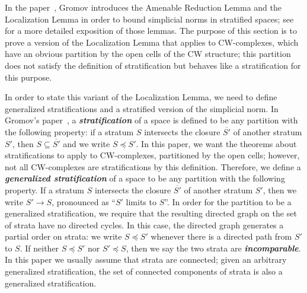 \documentclass[psamsfonts]{amsart}
\theoremstyle{remark}
\begin{document}
In the paper~\cite{Gromov09}, Gromov introduces the Amenable Reduction Lemma and the Localization Lemma in order to bound simplicial norms in stratified spaces; see~\cite{Alpert15} for a more detailed exposition of those lemmas.  The purpose of this section is to prove a version of the Localization Lemma that applies to CW-complexes, which have an obvious partition by the open cells of the CW structure; this partition does not satisfy the definition of stratification but behaves like a stratification for this purpose.

In order to state this variant of the Localization Lemma, we need to define generalized stratifications and a stratified version of the simplicial norm.  In Gromov's paper~\cite{Gromov09}, a \textbf{\emph{stratification}} of a space is defined to be any partition with the following property: if a stratum $S$ intersects the closure $\overline{S'}$ of another stratum $S'$, then $S \subseteq \overline{S'}$ and we write $S \preceq S'$.  In this paper, we want the theorems about stratifications to apply to CW-complexes, partitioned by the open cells; however, not all CW-complexes are stratifications by this definition.  Therefore, we define a \textbf{\emph{generalized stratification}} of a space to be any partition with the following property.  If a stratum $S$ intersects the closure $\overline{S'}$ of another stratum $S'$, then we write $S' \rightarrow S$, pronounced as ``$S'$ limits to $S$''.  In order for the partition to be a generalized stratification, we require that the resulting directed graph on the set of strata have no directed cycles.  In this case, the directed graph generates a partial order on strata: we write $S \preceq S'$ whenever there is a directed path from $S'$ to $S$.  If neither $S \preceq S'$ nor $S' \preceq S$, then we say the two strata are \textbf{\emph{incomparable}}.  In this paper we usually assume that strata are connected; given an arbitrary generalized stratification, the set of connected components of strata is also a generalized stratification.
\end{document}

